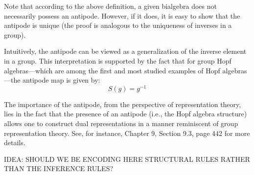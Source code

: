 \documentclass[a4paper,11pt]{report}
\begin{document}
Note that according to the above definition, a given bialgebra does not necessarily possess an antipode. However, if it does, it is easy to show that the antipode is unique (the proof is analogous to the uniqueness of inverses in a group).

Intuitively, the antipode can be viewed as a generalization of the inverse element in a group. This interpretation is supported by the fact that for group Hopf algebras—which are among the first and most studied examples of Hopf algebras—the antipode map is given by:
\[
S(g) = g^{-1}
\]

The importance of the antipode, from the perspective of representation theory, lies in the fact that the presence of an antipode (i.e., the Hopf algebra structure) allows one to construct dual representations in a manner reminiscent of group representation theory. See, for instance, Chapter 9, Section 9.3, page 442 for more details.

IDEA: SHOULD WE BE ENCODING HERE STRUCTURAL RULES RATHER THAN THE INFERENCE RULES?
\end{document}
